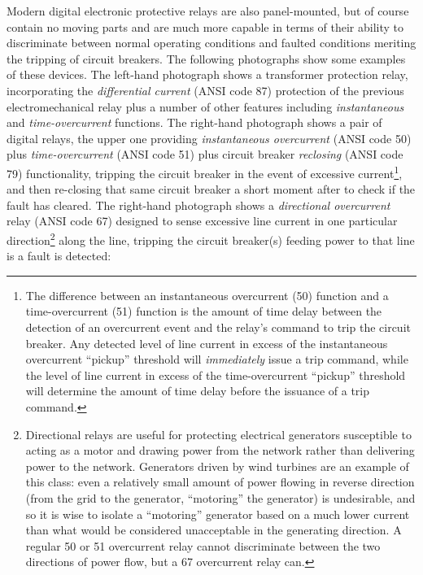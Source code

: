 Modern digital electronic protective relays are also panel-mounted, but of course contain no moving parts and are much more capable in terms of their ability to discriminate between normal operating conditions and faulted conditions meriting the tripping of circuit breakers.  The following photographs show some examples of these devices.  The left-hand photograph shows a transformer protection relay, incorporating the \textit{differential current} (ANSI code 87) protection of the previous electromechanical relay plus a number of other features including \textit{instantaneous} and \textit{time-overcurrent} functions.  The right-hand photograph shows a pair of digital relays, the upper one providing \textit{instantaneous overcurrent} (ANSI code 50) plus \textit{time-overcurrent} (ANSI code 51) plus circuit breaker \textit{reclosing} (ANSI code 79) functionality, tripping the circuit breaker in the event of excessive current\footnote{The difference between an instantaneous overcurrent (50) function and a time-overcurrent (51) function is the amount of time delay between the detection of an overcurrent event and the relay's command to trip the circuit breaker.  Any detected level of line current in excess of the instantaneous overcurrent ``pickup'' threshold will \textit{immediately} issue a trip command, while the level of line current in excess of the time-overcurrent ``pickup'' threshold will determine the amount of time delay before the issuance of a trip command.}, and then re-closing that same circuit breaker a short moment after to check if the fault has cleared.  The right-hand photograph shows a \textit{directional overcurrent} relay (ANSI code 67) designed to sense excessive line current in one particular direction\footnote{Directional relays are useful for protecting electrical generators susceptible to acting as a motor and drawing power from the network rather than delivering power to the network.  Generators driven by wind turbines are an example of this class: even a relatively small amount of power flowing in reverse direction (from the grid to the generator, ``motoring'' the generator) is undesirable, and so it is wise to isolate a ``motoring'' generator based on a much lower current than what would be considered unacceptable in the generating direction.  A regular 50 or 51 overcurrent relay cannot discriminate between the two directions of power flow, but a 67 overcurrent relay can.} along the line, tripping the circuit breaker(s) feeding power to that line is a fault is detected:

